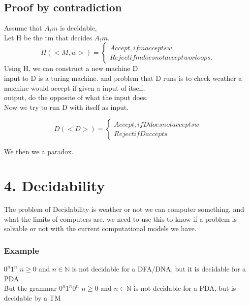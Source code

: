 \documentclass[a4paper,10pt,titlepage]{report}
\begin{document}
\subsection{Proof by contradiction}

Assume that $A_tm$ is decidable, \\
Let H be the tm that decides $A_tm$.\\

\[
H(<M,w>) = \left\{
                \begin{array}{ll}
                Accept, if m accepts w\\
                Reject if m does not accept w or loops.
\end{array}
\right.
  \]
Using H, we can construct a new machine D\\

input to D is a turing machine. and problem that D runs is to check weather a machine would accept if given a input of itself.\\

output, do the opposite of what the input does.\\

Now we try to run D with itself as input.

\[
D(<D>) = \left\{
                \begin{array}{ll}
                Accept, if D does not accepts w\\
                Reject if D accepts
\end{array}
\right.
  \]
  
We then we a paradox.\\



\newpage
\section{4. Decidability}
The problem of Decidability is weather or not we can computer something, and what the limits of computers are. we need to use this to know if a problem is solvable or not with the current computational models we have.

\subsubsection{Example}
$0^n1^n $   $ n \geq 0 $ and $n \in \mathbb{N}$ is not decidable for a DFA/DNA, but it is decidable for a PDA\\
But the grammar $0^n1^n0^n $   $ n \geq 0 $ and $n \in \mathbb{N}$ is not decidable for a PDA, but is decidable by a TM
\end{document}
